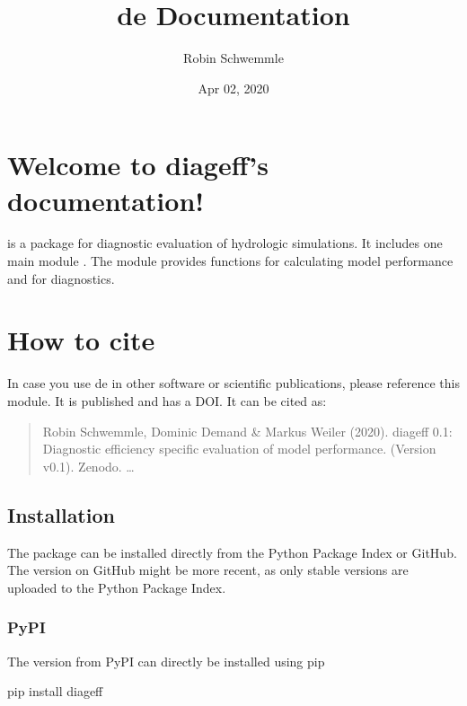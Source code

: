 \documentclass[letterpaper,10pt,english]{sphinxmanual}
\title{de Documentation}
\date{Apr 02, 2020}
\author{Robin Schwemmle}
\begin{document}
\pagestyle{empty}
\sphinxmaketitle
\pagestyle{plain}
\sphinxtableofcontents
\pagestyle{normal}
\label{\detokenize{index::doc}}



\chapter{Welcome to diag\sphinxhyphen{}eff’s documentation!}
\label{\detokenize{index:welcome-to-diag-eff-s-documentation}}
 is a package for diagnostic evaluation of hydrologic simulations. It
includes one main module . The module provides functions for calculating
model performance and for diagnostics.


\chapter{How to cite}
\label{\detokenize{index:how-to-cite}}
In case you use de in other software or scientific publications,
please reference this module. It is published and has a DOI. It can be cited
as:
\begin{quote}

Robin Schwemmle, Dominic Demand \& Markus Weiler (2020). diag\sphinxhyphen{}eff 0.1:
Diagnostic efficiency \textendash{} specific evaluation of model performance.
(Version v0.1). Zenodo. …
\end{quote}


\section{Installation}
\label{\detokenize{install:installation}}\label{\detokenize{install::doc}}
The package can be installed directly from the Python Package Index or GitHub.
The version on GitHub might be more recent, as only stable versions are
uploaded to the Python Package Index.


\subsection{PyPI}
\label{\detokenize{install:pypi}}
The version from PyPI can directly be installed using pip

\begin{sphinxVerbatim}[commandchars=\\\{\}]
pip install diag\PYGZhy{}eff
\end{sphinxVerbatim}
\end{document}
